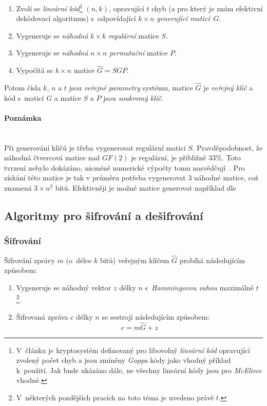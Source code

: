 \documentclass[thesis=M,czech,hidelinks]{FITthesis}[2012/06/26]
\newcommand{\0}{{\textcolor[gray]{0.80}{0}}}
\begin{document}
\begin{enumerate}
    \item Zvolí se \emph{lineární kód}\footnote{
            V~článku je kryptosystém definovaný pro libovolný \emph{lineární
            kód} opravující zvolený počet chyb a jsou zmíněny \emph{Goppa} kódy
            jako vhodný příklad k~použití. Jak bude ukázáno dále, ne všechny
            lineární kódy jsou pro \emph{McEliece} vhodné.
        } $(n,k)$, opravující $t$ chyb (a pro který je znám efektivní dekódovací
        algoritmus) s~odpovídající $k \times n$ \emph{generující maticí}~$G$.
    \item Vygeneruje se \emph{náhodná} $k \times k$ \emph{regulární} matice $S$.
    \item Vygeneruje se \emph{náhodná} $n \times n$ \emph{permutační} matice $P$.
    \item Vypočítá se $k \times n$ matice $\hat{G} = S G P$.
\end{enumerate}

Potom čísla $k$, $n$ a $t$ jsou \emph{veřejné parametry} systému, matice
$\hat{G}$ je \emph{veřejný klíč} a kód s~maticí $G$ a matice $S$ a $P$ jsou
\emph{soukromý klíč}.

\paragraph{Poznámka} \hfil \\
Při generování klíčů je třeba vygenerovat regulární matici $S$. Pravděpodobnost,
že náhodná čtvercová matice nad $GF(2)$ je regulární, je přibližně $33$\;\%.
Toto tvrzení nebylo dokázáno, nicméně numerické výpočty tomu
nasvědčují~\cite{Heyse}. Pro získání této matice je tak v průměru potřeba
vygenerovat $3$ náhodné matice, což znamená $3\times n^2$ bitů. Efektivněji je
možné matice generovat například dle~\cite{Randall}

\subsection{Algoritmy pro šifrování a dešifrování}\label{kap_mceliece_algoritmy}
\subsubsection{Šifrování}
Šifrování zprávy $m$ (o~délce $k$ bitů) veřejným klíčem $\hat{G}$ probíhá
následujícím způsobem:

\begin{enumerate}
    \item Vygeneruje se náhodný vektor $z$ délky $n$ s~\emph{Hammingovou vahou}
        maximálně $t$\footnote{
            V~některých pozdějších pracích na toto téma je
            uvedeno právě $t$.
        }.
    \item Šifrovaná zpráva $c$ délky $n$ se sestrojí následujícím způsobem:
        $$ c = m \hat{G} + z$$
\end{enumerate}
\end{document}
